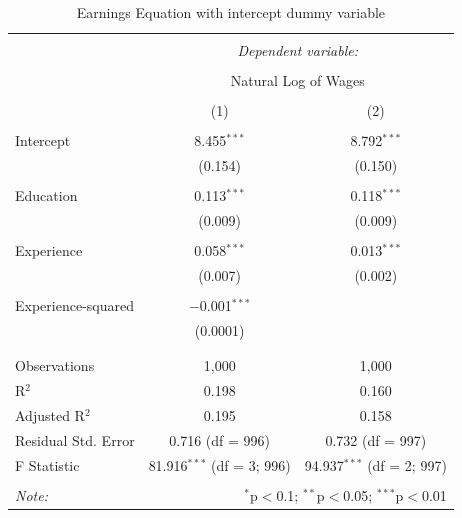\documentclass[
]{book}
\theoremstyle{definition}
\theoremstyle{definition}
\theoremstyle{definition}
\theoremstyle{definition}
\theoremstyle{remark}
\begin{document}
\begin{table}[!htbp] \centering 
  \caption{Earnings Equation  with intercept dummy variable} 
  \label{} 
\begin{tabular}{@{\extracolsep{5pt}}lcc} 
\\[-1.8ex]\hline 
\hline \\[-1.8ex] 
 & \multicolumn{2}{c}{\textit{Dependent variable:}} \\ 
\cline{2-3} 
\\[-1.8ex] & \multicolumn{2}{c}{Natural Log of Wages} \\ 
\\[-1.8ex] & (1) & (2)\\ 
\hline \\[-1.8ex] 
 Intercept & 8.455$^{***}$ & 8.792$^{***}$ \\ 
  & (0.154) & (0.150) \\ 
  & & \\ 
 Education & 0.113$^{***}$ & 0.118$^{***}$ \\ 
  & (0.009) & (0.009) \\ 
  & & \\ 
 Experience & 0.058$^{***}$ & 0.013$^{***}$ \\ 
  & (0.007) & (0.002) \\ 
  & & \\ 
 Experience-squared & $-$0.001$^{***}$ &  \\ 
  & (0.0001) &  \\ 
  & & \\ 
\hline \\[-1.8ex] 
Observations & 1,000 & 1,000 \\ 
R$^{2}$ & 0.198 & 0.160 \\ 
Adjusted R$^{2}$ & 0.195 & 0.158 \\ 
Residual Std. Error & 0.716 (df = 996) & 0.732 (df = 997) \\ 
F Statistic & 81.916$^{***}$ (df = 3; 996) & 94.937$^{***}$ (df = 2; 997) \\ 
\hline 
\hline \\[-1.8ex] 
\textit{Note:}  & \multicolumn{2}{r}{$^{*}$p$<$0.1; $^{**}$p$<$0.05; $^{***}$p$<$0.01} \\ 
\end{tabular} 
\end{table}
\end{document}
